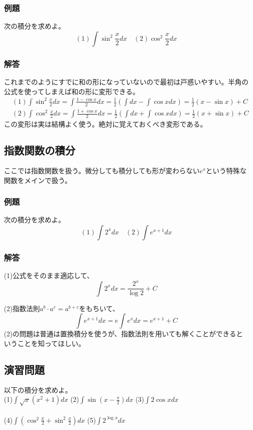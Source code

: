 \documentclass[a4j,dvipdfmx]{jsarticle}
\begin{document}
\subsubsection{例題}
次の積分を求めよ。
\begin{equation*}
    (1)\int \sin^2 \frac{x}{2}dx\quad (2)\cos^2 \frac{x}{2}dx 
\end{equation*}
\subsubsection*{解答}
これまでのようにすでに和の形になっていないので最初は戸惑いやすい。半角の公式を使ってしまえば和の形に変形できる。
\begin{align*}
    &(1)\int \sin^2 \frac{x}{2}dx=\int\frac{1-\cos x}{2}dx=\frac{1}{2}(\int dx-\int \cos xdx)=\frac{1}{2}(x-\sin x)+C\\
    &(2)\int \cos^2 \frac{x}{2}dx=\int\frac{1+\cos x}{2}dx=\frac{1}{2}(\int dx+\int \cos xdx)=\frac{1}{2}(x+\sin x)+C 
\end{align*}
この変形は実は結構よく使う。絶対に覚えておくべき変形である。
\newpage
\subsection{指数関数の積分}
ここでは指数関数を扱う。微分しても積分しても形が変わらない$e^x$という特殊な関数をメインで扱う。
\subsubsection{例題}
次の積分を求めよ。
\begin{equation*}
    (1)\int 2^x dx\quad(2)\int e^{x+1}dx
\end{equation*}
\subsubsection*{解答}
(1)公式をそのまま適応して、
\begin{equation*}
    \int 2^x dx=\frac{2^x}{\log 2}+C
\end{equation*}

(2)指数法則$a^b\cdot a^c=a^{b+c}$をもちいて、
\begin{equation*}
    \int e^{x+1}dx=e\int e^xdx=e^{x+1}+C
\end{equation*}
(2)の問題は普通は置換積分を使うが、指数法則を用いても解くことができるということを知ってほしい。\\
\hrulefill
\subsection{演習問題}
以下の積分を求めよ。\\
(1)$\displaystyle\int \sqrt{x}(x^2+1)dx$
\hspace*{20mm}
(2)$\displaystyle\int\sin(x-\frac{\pi}{2})dx$
\hspace*{20mm}
(3)$\displaystyle\int 2\cos xdx$
\\\\
(4)$\displaystyle \int (\cos^2\frac{x}{2}+\sin^2\frac{x}{2})dx$
\hspace*{12mm}
(5)$\displaystyle\int2^{\log x}dx$
\end{document}
